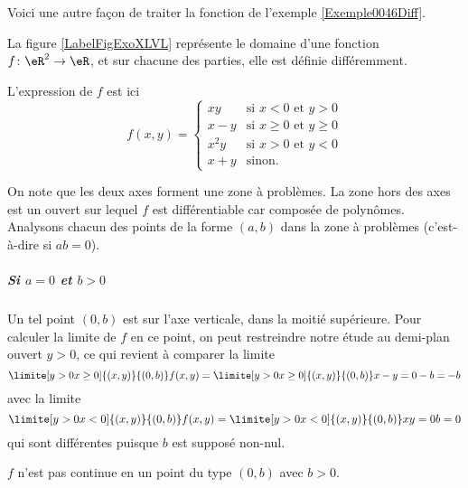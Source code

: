 \begin{example}
\end{example}

Voici une autre façon de traiter la fonction de l'exemple \ref{Exemple0046Diff}.

\begin{example} \label{ExeFHmCLII}
    La figure \ref{LabelFigExoXLVL} représente le domaine d'une fonction $f\colon \eR^2\to \eR$, et sur chacune des parties, elle est définie différemment.
    \newcommand{\CaptionFigExoXLVL}{La fonction de l'exemple \ref{ExeFHmCLII}.}


L'expression de $f$ est ici
\begin{equation*}
  f(x,y) =
  \begin{cases}
    xy & \text{si $x < 0$ et $y > 0$}\\
    x-y & \text{si $x \geq 0$ et $y \geq 0$}\\
    x^2y & \text{si $x > 0$ et $y < 0$}\\
    x+y & \text{sinon.}
  \end{cases}
\end{equation*}

On note que les deux axes forment une zone à problèmes. La zone hors
des axes est un ouvert sur lequel $f$ est différentiable car composée
de polynômes. Analysons chacun des points de la forme $(a,b)$ dans la
zone à problèmes (c'est-à-dire si $ab = 0$).

\subparagraph{Si $a = 0$ et $b > 0$} Un tel point $(0,b)$ est sur
l'axe verticale, dans la moitié supérieure. Pour calculer la limite de
$f$ en ce point, on peut restreindre notre étude au demi-plan ouvert
$y > 0$, ce qui revient à comparer la limite
\begin{equation*}
  \limite[y>0\\x\geq 0] {(x,y)} {(0,b)} f(x,y) =   \limite[y>0\\x\geq
  0] {(x,y)} {(0,b)} x-y = 0 - b = -b
\end{equation*}
avec la limite
\begin{equation*}
  \limite[y>0\\x<0] {(x,y)} {(0,b)} f(x,y) =   \limite[y>0\\x<0]
  {(x,y)} {(0,b)} xy = 0 b = 0
\end{equation*}
qui sont différentes puisque $b$ est supposé non-nul.

\conclusion $f$ n'est pas continue en un point du type $(0,b)$ avec $b
> 0$.


\end{example}
